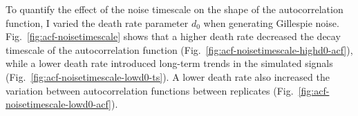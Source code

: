 

To quantify the effect of the noise timescale on the shape of the autocorrelation function, I varied the death rate parameter $d_{0}$ when generating Gillespie noise.
%
Fig.\ \ref{fig:acf-noisetimescale} shows that a higher death rate decreased the decay timescale of the autocorrelation function (Fig.\ \ref{fig:acf-noisetimescale-highd0-acf}), while a lower death rate introduced long-term trends in the simulated signals (Fig.\ \ref{fig:acf-noisetimescale-lowd0-ts}).
A lower death rate also increased the variation between autocorrelation functions between replicates (Fig.\ \ref{fig:acf-noisetimescale-lowd0-acf}).



